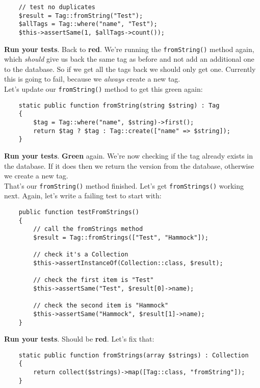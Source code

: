 \begin{verbatim}
    // test no duplicates
    $result = Tag::fromString("Test");
    $allTags = Tag::where("name", "Test");
    $this->assertSame(1, $allTags->count());
\end{verbatim}

\textbf{Run your tests}. Back to \textbf{red}. We're running the \texttt{fromString()} method again, which \textit{should} give us back the same tag as before and not add an additional one to the database. So if we get all the tags back we should only get one. Currently this is going to fail, because we \textit{always} create a new tag.
\\

Let's update our \texttt{fromString()} method to get this green again:

\begin{verbatim}
    static public function fromString(string $string) : Tag
    {
        $tag = Tag::where("name", $string)->first();
        return $tag ? $tag : Tag::create(["name" => $string]);
    }
\end{verbatim}

\textbf{Run your tests}. \textbf{Green} again. We're now checking if the tag already exists in the database. If it does then we return the version from the database, otherwise we create a new tag.
\\

That's our \texttt{fromString()} method finished. Let's get \texttt{fromStrings()} working next. Again, let's write a failing test to start with:

\begin{verbatim}
    public function testFromStrings()
    {
        // call the fromStrings method
        $result = Tag::fromStrings(["Test", "Hammock"]);

        // check it's a Collection
        $this->assertInstanceOf(Collection::class, $result);

        // check the first item is "Test"
        $this->assertSame("Test", $result[0]->name);

        // check the second item is "Hammock"
        $this->assertSame("Hammock", $result[1]->name);
    }
\end{verbatim}

\textbf{Run your tests}. Should be \textbf{red}. Let's fix that:

\begin{verbatim}
    static public function fromStrings(array $strings) : Collection
    {
        return collect($strings)->map([Tag::class, "fromString"]);
    }
\end{verbatim}

